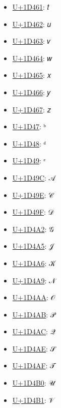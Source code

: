 \begin{itemize}
	\item \href{https://www.compart.com/en/unicode/U+1D461}{U+1D461}: 𝑡
	\item \href{https://www.compart.com/en/unicode/U+1D462}{U+1D462}: 𝑢
	\item \href{https://www.compart.com/en/unicode/U+1D463}{U+1D463}: 𝑣
	\item \href{https://www.compart.com/en/unicode/U+1D464}{U+1D464}: 𝑤
	\item \href{https://www.compart.com/en/unicode/U+1D465}{U+1D465}: 𝑥
	\item \href{https://www.compart.com/en/unicode/U+1D466}{U+1D466}: 𝑦
	\item \href{https://www.compart.com/en/unicode/U+1D467}{U+1D467}: 𝑧
	\item \href{https://www.compart.com/en/unicode/U+1D47}{U+1D47}: ᵇ
	\item \href{https://www.compart.com/en/unicode/U+1D48}{U+1D48}: ᵈ
	\item \href{https://www.compart.com/en/unicode/U+1D49}{U+1D49}: ᵉ
	\item \href{https://www.compart.com/en/unicode/U+1D49C}{U+1D49C}: 𝒜
	\item \href{https://www.compart.com/en/unicode/U+1D49E}{U+1D49E}: 𝒞
	\item \href{https://www.compart.com/en/unicode/U+1D49F}{U+1D49F}: 𝒟
	\item \href{https://www.compart.com/en/unicode/U+1D4A2}{U+1D4A2}: 𝒢
	\item \href{https://www.compart.com/en/unicode/U+1D4A5}{U+1D4A5}: 𝒥
	\item \href{https://www.compart.com/en/unicode/U+1D4A6}{U+1D4A6}: 𝒦
	\item \href{https://www.compart.com/en/unicode/U+1D4A9}{U+1D4A9}: 𝒩
	\item \href{https://www.compart.com/en/unicode/U+1D4AA}{U+1D4AA}: 𝒪
	\item \href{https://www.compart.com/en/unicode/U+1D4AB}{U+1D4AB}: 𝒫
	\item \href{https://www.compart.com/en/unicode/U+1D4AC}{U+1D4AC}: 𝒬
	\item \href{https://www.compart.com/en/unicode/U+1D4AE}{U+1D4AE}: 𝒮
	\item \href{https://www.compart.com/en/unicode/U+1D4AF}{U+1D4AF}: 𝒯
	\item \href{https://www.compart.com/en/unicode/U+1D4B0}{U+1D4B0}: 𝒰
	\item \href{https://www.compart.com/en/unicode/U+1D4B1}{U+1D4B1}: 𝒱

\end{itemize}
